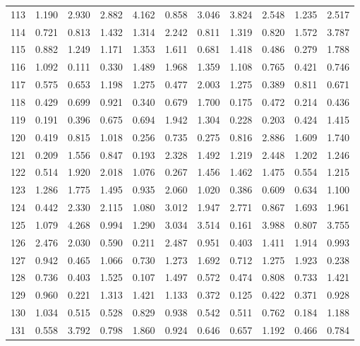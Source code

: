 \begin{tabular}{lrrrrrrrrrr}
113 &  1.190 &  2.930 &  2.882 &  4.162 &  0.858 &  3.046 &  3.824 &  2.548 &  1.235 &  2.517 \\
114 &  0.721 &  0.813 &  1.432 &  1.314 &  2.242 &  0.811 &  1.319 &  0.820 &  1.572 &  3.787 \\
115 &  0.882 &  1.249 &  1.171 &  1.353 &  1.611 &  0.681 &  1.418 &  0.486 &  0.279 &  1.788 \\
116 &  1.092 &  0.111 &  0.330 &  1.489 &  1.968 &  1.359 &  1.108 &  0.765 &  0.421 &  0.746 \\
117 &  0.575 &  0.653 &  1.198 &  1.275 &  0.477 &  2.003 &  1.275 &  0.389 &  0.811 &  0.671 \\
118 &  0.429 &  0.699 &  0.921 &  0.340 &  0.679 &  1.700 &  0.175 &  0.472 &  0.214 &  0.436 \\
119 &  0.191 &  0.396 &  0.675 &  0.694 &  1.942 &  1.304 &  0.228 &  0.203 &  0.424 &  1.415 \\
120 &  0.419 &  0.815 &  1.018 &  0.256 &  0.735 &  0.275 &  0.816 &  2.886 &  1.609 &  1.740 \\
121 &  0.209 &  1.556 &  0.847 &  0.193 &  2.328 &  1.492 &  1.219 &  2.448 &  1.202 &  1.246 \\
122 &  0.514 &  1.920 &  2.018 &  1.076 &  0.267 &  1.456 &  1.462 &  1.475 &  0.554 &  1.215 \\
123 &  1.286 &  1.775 &  1.495 &  0.935 &  2.060 &  1.020 &  0.386 &  0.609 &  0.634 &  1.100 \\
124 &  0.442 &  2.330 &  2.115 &  1.080 &  3.012 &  1.947 &  2.771 &  0.867 &  1.693 &  1.961 \\
125 &  1.079 &  4.268 &  0.994 &  1.290 &  3.034 &  3.514 &  0.161 &  3.988 &  0.807 &  3.755 \\
126 &  2.476 &  2.030 &  0.590 &  0.211 &  2.487 &  0.951 &  0.403 &  1.411 &  1.914 &  0.993 \\
127 &  0.942 &  0.465 &  1.066 &  0.730 &  1.273 &  1.692 &  0.712 &  1.275 &  1.923 &  0.238 \\
128 &  0.736 &  0.403 &  1.525 &  0.107 &  1.497 &  0.572 &  0.474 &  0.808 &  0.733 &  1.421 \\
129 &  0.960 &  0.221 &  1.313 &  1.421 &  1.133 &  0.372 &  0.125 &  0.422 &  0.371 &  0.928 \\
130 &  1.034 &  0.515 &  0.528 &  0.829 &  0.938 &  0.542 &  0.511 &  0.762 &  0.184 &  1.188 \\
131 &  0.558 &  3.792 &  0.798 &  1.860 &  0.924 &  0.646 &  0.657 &  1.192 &  0.466 &  0.784 \\

\end{tabular}
